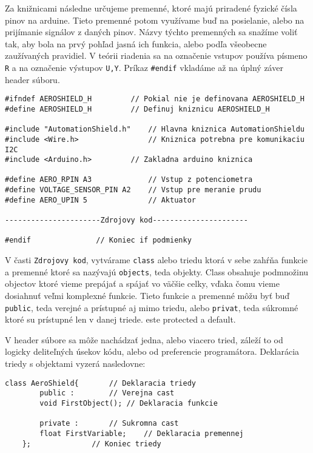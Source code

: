 Za knižnicami následne určujeme premenné, ktoré majú priradené fyzické čísla pinov na arduine. Tieto premenné potom využívame buď na posielanie, alebo na prijímanie signálov z daných pinov. Názvy týchto premenných sa snažíme voliť tak, aby bola na prvý pohľad jasná ich funkcia, alebo podľa všeobecne zaužívaných pravidiel. V teórii riadenia sa na označenie vstupov používa písmeno \verb|R| a na označenie výstupov \verb|U,Y|. Príkaz \verb|#endif| vkladáme až na úplný záver header súboru.

\begin{lstlisting}[caption={Ukážka zdrojového kódu headeru.},captionpos=b]
#ifndef AEROSHIELD_H	 	 // Pokial nie je definovana AEROSHIELD_H
#define AEROSHIELD_H	 	 // Definuj kniznicu AEROSHIELD_H

#include "AutomationShield.h"    // Hlavna kniznica AutomationShieldu
#include <Wire.h>                // Kniznica potrebna pre komunikaciu I2C
#include <Arduino.h>		 // Zakladna arduino kniznica

#define AERO_RPIN A3             // Vstup z potenciometra
#define VOLTAGE_SENSOR_PIN A2    // Vstup pre meranie prudu 
#define AERO_UPIN 5              // Aktuator

----------------------Zdrojovy kod----------------------

#endif			   	 // Koniec if podmienky 
\end{lstlisting}



V časti \verb|Zdrojovy kod|, vytvárame \verb|class| alebo triedu ktorá v sebe zahŕňa funkcie a premenné ktoré sa nazývajú \verb|objects|, teda objekty. Class obsahuje podmnožinu objectov ktoré vieme prepájať a spájať vo väčšie celky, vďaka čomu vieme dosiahnuť veľmi komplexné funkcie. Tieto funkcie a premenné môžu byť buď \verb|public|, teda verejné a prístupné aj mimo triedu, alebo \verb|privat|, teda súkromné ktoré su prístupné len v danej triede.
este protected a default.

 V header súbore sa môže nachádzať jedna, alebo viacero tried, záleží to od logicky deliteľných úsekov kódu, alebo od preferencie programátora. Deklarácia triedy s objektami vyzerá nasledovne: 

\begin{lstlisting}[caption={Triedy a objekty.},captionpos=b]
	class AeroShield{		// Deklaracia triedy
		public :		// Verejna cast
		void FirstObject();	// Deklaracia funkcie
		
		private :		// Sukromna cast
		float FirstVariable;	// Deklaracia premennej
	};				// Koniec triedy
\end{lstlisting}

